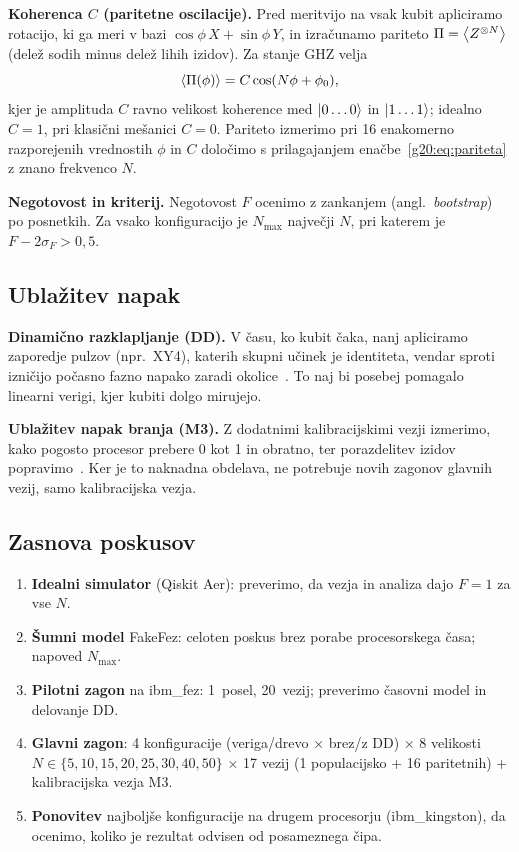 \textbf{Koherenca $C$ (paritetne oscilacije).} Pred meritvijo na vsak kubit apliciramo rotacijo, ki ga meri v bazi
$\cos\phi\,X+\sin\phi\,Y$, in izračunamo pariteto $\Pi=\expval{Z^{\otimes N}}$ (delež sodih minus delež lihih izidov). Za
stanje GHZ velja
\begin{equation}
\expval{\Pi(\phi)} = C\cos(N\phi + \phi_0),
\label{g20:eq:pariteta}
\end{equation}
kjer je amplituda $C$ ravno velikost koherence med $\ket{0\dots0}$ in $\ket{1\dots1}$; idealno $C=1$, pri klasični mešanici
$C=0$. Pariteto izmerimo pri 16 enakomerno razporejenih vrednostih $\phi$ in $C$ določimo s prilagajanjem
enačbe~\eqref{g20:eq:pariteta} z znano frekvenco $N$.

\textbf{Negotovost in kriterij.} Negotovost $F$ ocenimo z zankanjem (angl.\ \emph{bootstrap}) po posnetkih. Za vsako
konfiguracijo je $N_{\max}$ največji $N$, pri katerem je $F-2\sigma_F>0{,}5$.

\subsection{Ublažitev napak}
\label{g20:sec:ublazitev}

\textbf{Dinamično razklapljanje (DD).} V času, ko kubit čaka, nanj apliciramo zaporedje pulzov (npr.\ XY4), katerih skupni
učinek je identiteta, vendar sproti izničijo počasno fazno napako zaradi okolice~\cite{g20:viola1999, g20:ezzell2023}. To
naj bi posebej pomagalo linearni verigi, kjer kubiti dolgo mirujejo.

\textbf{Ublažitev napak branja (M3).} Z dodatnimi kalibracijskimi vezji izmerimo, kako pogosto procesor prebere 0 kot 1 in
obratno, ter porazdelitev izidov popravimo~\cite{g20:nation2021}. Ker je to naknadna obdelava, ne potrebuje novih zagonov
glavnih vezij, samo kalibracijska vezja.

\subsection{Zasnova poskusov}
\label{g20:sec:poskusi}

\begin{enumerate}
\item \textbf{Idealni simulator} (Qiskit Aer): preverimo, da vezja in analiza dajo $F=1$ za vse $N$.
\item \textbf{Šumni model} FakeFez: celoten poskus brez porabe procesorskega časa; napoved $N_{\max}$.
\item \textbf{Pilotni zagon} na ibm\_fez: 1~posel, 20~vezij; preverimo časovni model in delovanje DD.
\item \textbf{Glavni zagon}: 4 konfiguracije (veriga/drevo $\times$ brez/z DD) $\times$ 8 velikosti
      $N\in\{5,10,15,20,25,30,40,50\}$ $\times$ 17 vezij (1 populacijsko + 16 paritetnih) + kalibracijska vezja M3.
\item \textbf{Ponovitev} najboljše konfiguracije na drugem procesorju (ibm\_kingston), da ocenimo, koliko je rezultat
      odvisen od posameznega čipa.
\end{enumerate}

